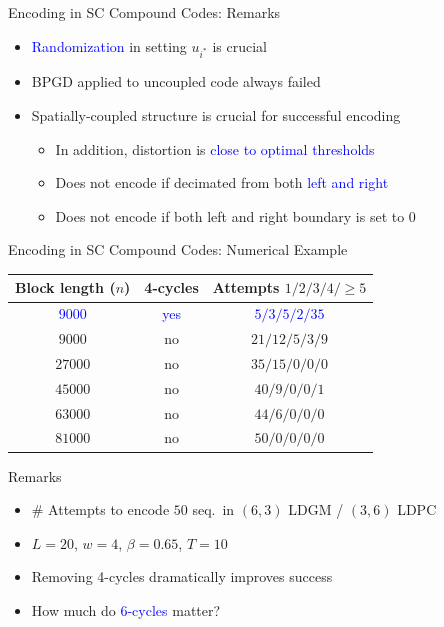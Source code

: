 \documentclass[10pt,presentation]{beamer}
\begin{document}
\begin{frame}{Encoding in SC Compound Codes: Remarks}
  \begin{itemize}
  \item \textcolor{blue}{Randomization} in setting $u_{i^*}$ is crucial \vspace{0.3cm}
  \item BPGD applied to uncoupled code \alert{always failed} \vspace{0.3cm}
  \item \alert{Spatially-coupled structure} is crucial for successful encoding \vspace{0.15cm}
    \begin{itemize}
    \item In addition, distortion is \textcolor{blue}{close to optimal thresholds} \vspace{0.2cm}
    \item \alert{Does not encode} if decimated from both \textcolor{blue}{left and right}\vspace{0.2cm}
    \item \alert{Does not encode} if both left and right boundary is set to 0 \vspace{0.2cm}
    \end{itemize}
  \end{itemize}
\end{frame}

\begin{frame}{Encoding in SC Compound Codes: Numerical Example}
  \begin{center}
    \begin{tabular}{|c|c|c|}
      \hline
      Block length ($n$) & 4-cycles & Attempts $1/2/3/4/\geq 5$  \\
      \hline
      \textcolor{blue}{$9000$} & \textcolor{blue}{yes} & \textcolor{blue}{$5/3/5/2/35$} \\
      $9000$ & no & $21/12/5/3/9$ \\
      $27000$ & no & $35/15/0/0/0$ \\
      $45000$ & no & $40/9/0/0/1$ \\
      $63000$ & no & $44/6/0/0/0$ \\
      \alert{$81000$} & \alert{no} & \alert{$50/0/0/0/0$}\\ 
      \hline  
    \end{tabular}
  \end{center}
  \begin{block}{Remarks}
    \begin{itemize}
    \item \# Attempts to encode $50$ seq.~in $(6,3)$ LDGM / $(3,6)$ LDPC
    \item $L=20$, $w=4$, $\beta=0.65$, $T=10$
    \item Removing \alert{4-cycles} dramatically improves success
    \item How much do \textcolor{blue}{6-cycles} matter?
    \end{itemize}
  \end{block}
\end{frame}
\end{document}
